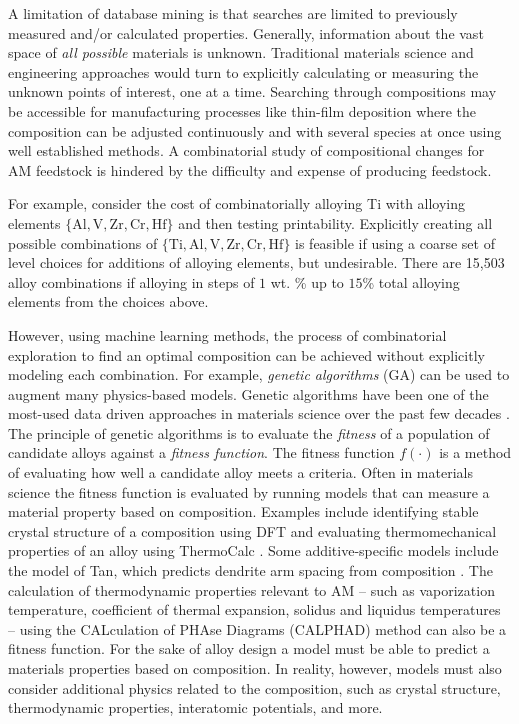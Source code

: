 A limitation of database mining is that searches are limited to previously measured and/or calculated properties. Generally, information about the vast space of \textit{all possible} materials is unknown. Traditional materials science and engineering approaches would turn to explicitly calculating or measuring the unknown points of interest, one at a time. Searching through compositions may be accessible for manufacturing processes like thin-film deposition where the composition can be adjusted continuously and with several species at once using well established methods. A combinatorial study of compositional changes for AM feedstock is hindered by the difficulty and expense of producing feedstock.

For example, consider the cost of combinatorially alloying Ti with alloying elements $\{\text{Al}, \text{V}, \text{Zr}, \text{Cr}, \text{Hf}\}$ and then testing printability. Explicitly creating all possible combinations of $\{\text{Ti},\text{Al}, \text{V}, \text{Zr}, \text{Cr}, \text{Hf}\}$ is feasible if using a coarse set of level choices for additions of alloying elements, but undesirable. There are 15,503 alloy combinations if alloying in steps of $1$ wt. \% up to $15$\% total alloying elements from the choices above.

However, using machine learning methods, the process of combinatorial exploration to find an optimal composition can be achieved without explicitly modeling each combination. For example, \textit{genetic algorithms} (GA) can be used to augment many physics-based models. Genetic algorithms have been one of the most-used data driven approaches in materials science over the past few decades \cite{Morris1996, Ho1998, Wolf2000, Johannesson2002, Stucke2003, Hart2005, Oganov2006}. The principle of genetic algorithms is to evaluate the \textit{fitness} of a population of candidate alloys against a \textit{fitness function}. The fitness function $f(\cdot)$ is a method of evaluating how well a candidate alloy meets a criteria. Often in materials science the fitness function is evaluated by running models that can measure a material property based on composition. Examples include identifying stable crystal structure of a composition using DFT\cite{Franceschetti1999, Oganov2006} and evaluating thermomechanical properties of an alloy using ThermoCalc \cite{Xu2008}. Some additive-specific models include the model of Tan, which predicts dendrite arm spacing from composition \cite{Tan2011}. The calculation of thermodynamic properties relevant to AM -- such as vaporization temperature, coefficient of thermal expansion, solidus and liquidus temperatures -- using the CALculation of PHAse Diagrams (CALPHAD) method \cite{Andersson2002} can also be a fitness function.  For the sake of alloy design a model must be able to predict a materials properties based on composition. In reality, however, models must also consider additional physics related to the composition, such as crystal structure, thermodynamic properties, interatomic potentials, and more.

